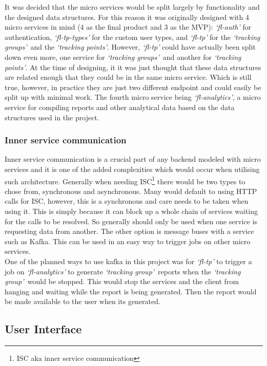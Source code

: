 \documentclass{article}
\newcommand{\vspaceconst}{-2ex}
\newcommand{\tps}{\textit{`tracking points'}}
\newcommand{\tg}{\textit{`tracking group'}}
\newcommand{\tgs}{\textit{`tracking groups'}}
\begin{document}
\begin{multicols}{2}
It was decided that the micro services would be split largely by functionality and the designed data structures. For this reason it was originally designed with 4 micro services in mind (4 as the final product and 3 as the MVP): \textit{`fl-auth'} for authentication, \textit{`fl-tp-types'} for the custom user types, and \textit{`fl-tp'} for the \tgs~and the \tps. However, \textit{`fl-tp'} could have actually been split down even more, one service for \tgs~and another for \tps. At the time of designing, it it was just thought that these data structures are related enough that they could be in the same micro service. Which is still true, however, in practice they are just two different endpoint and could easily be split up with minimal work. The fourth micro service being \textit{`fl-analytics'}, a micro service for compiling reports and other analytical data based on the data structures used in the project.\\

\subsubsection{Inner service communication}
\vspace{\vspaceconst}
Inner service communication is a crucial part of any backend modeled with micro services and it is one of the added complexities which would occur when utilising such architecture. Generally when needing ISC\footnote{ISC aka inner service communication} there would be two types to chose from, synchronous and asynchronous. Many would default to using HTTP calls for ISC, however, this is a synchronous and care needs to be taken when using it. This is simply because it can block up a whole chain of services waiting for the calls to be resolved. So generally should only be used when one service is requesting data from another. The other option is message buses with a service such as Kafka\cite{kafka}. This can be used in an easy way to trigger jobs on other micro services.\\
One of the planned ways to use kafka in this project was for \textit{`fl-tp'} to trigger a job on \textit{`fl-analytics'} to generate \tg~reports when the \tg~would be stopped. This would stop the services and the client from hanging and waiting while the report is being generated. Then the report would be made available to the user when its generated.\\

\subsection{User Interface}
\vspace{\vspaceconst}


\end{multicols}
\end{document}
